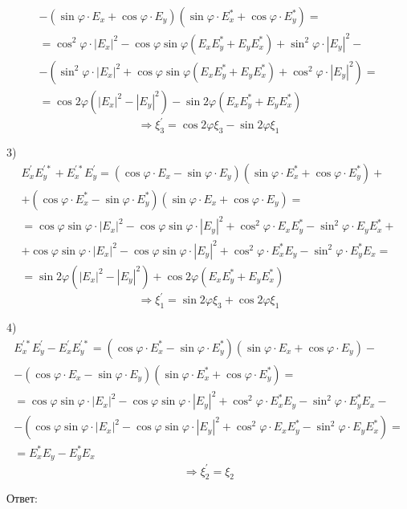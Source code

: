\documentclass[12pt]{article}
\begin{document}
\begin{large}
\begin{eqnarray*}
    - \left( \sin \varphi \cdot E_x + \cos \varphi \cdot E_y \right) \left( \sin \varphi \cdot E_x^* + \cos \varphi \cdot E_y^* \right) = \\
    = \cos^2 \varphi \cdot |E_x|^2 - \cos \varphi \sin \varphi \left( E_x E_y^* + E_y E_x^* \right) + \sin^2 \varphi \cdot |E_y|^2 - \\
    - \left( \sin^2 \varphi \cdot |E_x|^2 + \cos \varphi \sin \varphi \left( E_x E_y^* + E_y E_x^* \right) + \cos^2 \varphi \cdot |E_y|^2 \right) = \\
    = \cos 2 \varphi \left( |E_{x}|^2 - |E_{y}|^2 \right) - \sin 2 \varphi \left( E_x E_y^* + E_y E_x^* \right)
\end{eqnarray*}
\[
    \Rightarrow \xi_3^{'} = \cos 2 \varphi \xi_3 - \sin 2 \varphi \xi_1
\]
\par 3)
\begin{eqnarray*}
    E_{x}^{'}E_{y}^{'*} + E_{x}^{'*}E_{y}^{'} = \left( \cos \varphi \cdot E_x - \sin \varphi \cdot E_y \right)\left( \sin \varphi \cdot E_x^* + \cos \varphi \cdot E_y^* \right) + \\
    + \left( \cos \varphi \cdot E_x^* - \sin \varphi \cdot E_y^* \right) \left( \sin \varphi \cdot E_x + \cos \varphi \cdot E_y \right) = \\
    = \cos \varphi \sin \varphi \cdot |E_x|^2 - \cos \varphi \sin \varphi \cdot |E_y|^2 + \cos^2 \varphi \cdot E_x E_y^* - \sin^2 \varphi \cdot E_y E_x^* + \\
    + \cos \varphi \sin \varphi \cdot |E_x|^2 - \cos \varphi \sin \varphi \cdot |E_y|^2 + \cos^2 \varphi \cdot E_x^* E_y - \sin^2 \varphi \cdot E_y^* E_x = \\
    = \sin 2 \varphi \left( |E_{x}|^2 - |E_{y}|^2 \right) + \cos 2 \varphi \left( E_x E_y^* + E_y E_x^* \right)
\end{eqnarray*}
\[
    \Rightarrow \xi_1^{'} = \sin 2 \varphi \xi_3 + \cos 2 \varphi \xi_1
\]
\par 4)
\begin{eqnarray*}
    E_{x}^{'*}E_{y}^{'} - E_{x}^{'}E_{y}^{'*} = \left( \cos \varphi \cdot E_x^* - \sin \varphi \cdot E_y^* \right)\left( \sin \varphi \cdot E_x + \cos \varphi \cdot E_y \right) - \\
    - \left( \cos \varphi \cdot E_x - \sin \varphi \cdot E_y \right) \left( \sin \varphi \cdot E_x^* + \cos \varphi \cdot E_y^* \right) = \\
    = \cos \varphi \sin \varphi \cdot |E_x|^2 - \cos \varphi \sin \varphi \cdot |E_y|^2 + \cos^2 \varphi \cdot E_x^* E_y - \sin^2 \varphi \cdot E_y^* E_x - \\
    - \left(  \cos \varphi \sin \varphi \cdot |E_x|^2 - \cos \varphi \sin \varphi \cdot |E_y|^2 + \cos^2 \varphi \cdot E_x E_y^* - \sin^2 \varphi \cdot E_y E_x^*  \right) = \\
    = E_x^* E_y - E_y^* E_x
\end{eqnarray*}
\[
    \Rightarrow \xi_2^{'} = \xi_2
\]
\par Ответ:


\end{large}
\end{document}
